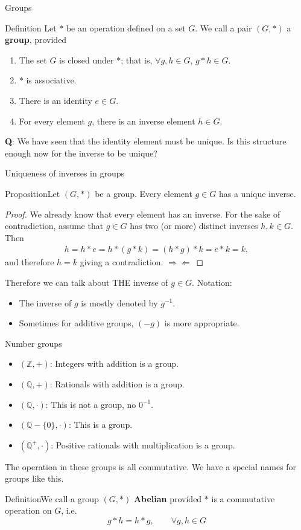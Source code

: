 \documentclass{beamer}
\def\bl[#1]#2{\begin{block}{#1}#2\end{block}}
\def\enumb{\begin{enumerate}}
\def\enume{\end{enumerate}}
\def\itemb{\begin{itemize}}
\def\iteme{\end{itemize}}
\begin{document}
\begin{frame}{Groups}
\bl[Definition]{ Let $*$ be an operation defined on a set $G$. We call a pair $(G,*)$ a \textbf{group}, provided
\enumb
\item The set $G$ is closed under $*$; that is, $\forall g,h\in G$, $g*h\in G$.
\item $*$ is associative.
\item There is an identity $e\in G$.
\item For every element $g$, there is an inverse element $h\in G$.
\enume}

\textbf{Q}: We have seen that the identity element must be unique. Is this structure enough now for the inverse to be unique? 

\end{frame}

\begin{frame}{Uniqueness of inverses in groups}
\bl[Proposition]{Let $(G,*)$ be a group. Every element $g\in G$ has a unique inverse.}
\begin{proof}
We already know that every element has an inverse. For the sake of contradiction, assume that $g\in G$ has two (or more) distinct inverses $h,k\in G$. Then
\begin{align*}
h=h*e=h*(g*k)=(h*g)*k=e*k=k,
\end{align*}
and therefore $h=k$ giving a contradiction. $\Rightarrow\Leftarrow$
\end{proof}
Therefore we can talk about THE inverse of $g\in G$. Notation:
\itemb
\item The inverse of $g$ is mostly denoted by $g^{-1}$.
\item Sometimes for additive groups, $(-g)$ is more appropriate.
\iteme
\end{frame}

\begin{frame}{Number groups}
\itemb
\item $(\mathbb{Z},+)$: Integers with addition is a group.
\item $(\mathbb{Q},+)$: Rationals with addition is a group.
\item $(\mathbb{Q},\cdot)$: This is not a group, no $0^{-1}$.
\item $(\mathbb{Q}-\{0\},\cdot)$: This is a group.
\item $(\mathbb{Q}^+,\cdot)$: Positive rationals with multiplication is a group.
\iteme
The operation in these groups is all commutative. We have a special names for groups like this.
\bl[Definition]{We call a group $(G,*)$ \textbf{Abelian} provided $*$ is a commutative operation on $G$, i.e.
\[
g*h=h*g,\qquad\forall g,h\in G
\]}
\end{frame}
\end{document}

